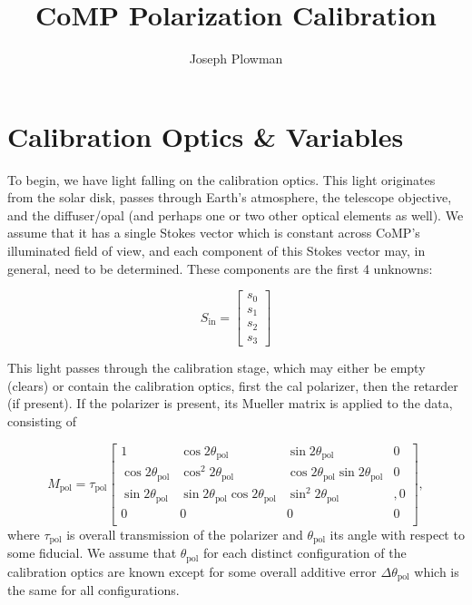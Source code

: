 \documentclass[11pt]{article}
\begin{document}
\title{\vspace{-3cm} CoMP Polarization Calibration}
\author{Joseph Plowman}
\date{}
\maketitle
\section{Calibration Optics \& Variables}
To begin, we have light falling on the calibration optics. This light originates from the solar disk, passes through Earth's atmosphere, the telescope objective, and the diffuser/opal (and perhaps one or two other optical elements as well). We assume that it has a single Stokes vector which is constant across CoMP's illuminated field of view, and each component of this Stokes vector may, in general, need to be determined. These components are the first 4 unknowns:

\begin{equation}
	S_{\mathrm{in}} = 
	\begin{bmatrix}
		s_0 \\
		s_1 \\
		s_2 \\
		s_3
	\end{bmatrix}
\end{equation}

This light passes through the calibration stage, which may either be empty (clears) or contain the calibration optics, first the cal polarizer, then the retarder (if present). If the polarizer is present, its Mueller matrix is applied to the data, consisting of

\begin{equation}
	M_{\mathrm{pol}} = \tau_{\mathrm{pol}}
	\begin{bmatrix}
		1 & \cos{2\theta_{\mathrm{pol}}} & \sin{2\theta_{\mathrm{pol}}} & 0 \\
		\cos{2\theta_{\mathrm{pol}}} & \cos^2{2\theta_{\mathrm{pol}}} & \cos{2\theta_{\mathrm{pol}}}\sin{2\theta_{\mathrm{pol}}} & 0 \\
		\sin{2\theta_{\mathrm{pol}}} & \sin{2\theta_{\mathrm{pol}}}\cos{2\theta_{\mathrm{pol}}} & \sin^2{2\theta_{\mathrm{pol}}} & ,0 \\
		0 & 0 & 0 & 0 \\
	\end{bmatrix},
\end{equation}
where $\tau_{\mathrm{pol}}$ is overall transmission of the polarizer and $\theta_{\mathrm{pol}}$ its angle with respect to some fiducial. We assume that $\theta_{\mathrm{pol}}$ for each distinct configuration of the calibration optics are known except for some overall additive error $\Delta\theta_{\mathrm{pol}}$ which is the same for all configurations.
\end{document}
